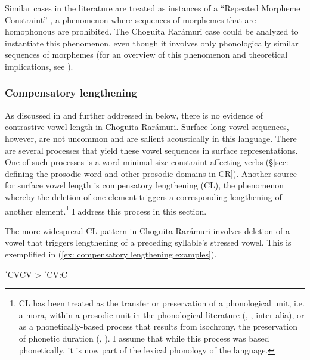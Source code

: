 Similar cases in the literature are treated as instances of a ``Repeated Morpheme Constraint'' \parencite{menn1984repeated}, a phenomenon where sequences of morphemes that are homophonous are prohibited. The Choguita Rarámuri case could be analyzed to instantiate this phenomenon, even though it involves only phonologically similar sequences of morphemes (for an overview of this phenomenon and theoretical implications, see \citet{inkelas2014interplay}).

\subsubsection{Compensatory lengthening}
\label{subsubsec: compensatory lengthening}

As discussed in  and further addressed in  below, there is no evidence of contrastive vowel length in Choguita Rarámuri. Surface long vowel sequences, however, are not uncommon and are salient acoustically in this language. There are several processes that yield these vowel sequences in surface representations. One of such processes is a word minimal size constraint affecting verbs (§\ref{sec: defining the prosodic word and other prosodic domains in CR}). Another source for surface vowel length is compensatory lengthening (CL), the phenomenon whereby the deletion of one element triggers a corresponding lengthening of another element.\footnote{CL has been treated as the transfer or preservation of a phonological unit, i.e. a mora, within a prosodic unit in the phonological literature (\citealt{hyman2003theory}, \citealt{mccarthy1996prosodic}, inter alia), or as a phonetically-based process that results from isochrony, the preservation of phonetic duration (\citealt{timberlake1983compensatory}, \citealt{barnes2000compensatory}). I assume that while this process was based phonetically, it is now part of the lexical phonology of the language.}  I address this process in this section.

The more widespread CL pattern in Choguita Rarámuri involves deletion of a vowel that triggers lengthening of a preceding syllable’s stressed vowel. This is exemplified in (\ref{ex: compensatory lengthening examples}).

\ea\label{ex: compensatory lengthening examples}
{ˈCVCV  >  ˈCV:C}

